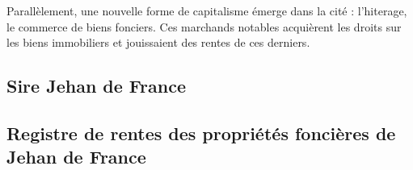 Parallèlement, une nouvelle forme de capitalisme émerge dans la cité : l'hiterage, le commerce de biens fonciers. Ces marchands notables acquièrent les droits sur les biens immobiliers et jouissaient des rentes de ces derniers.


\subsection{Sire Jehan de France}
\subsection{Registre de rentes des propriétés foncières de Jehan de France}

